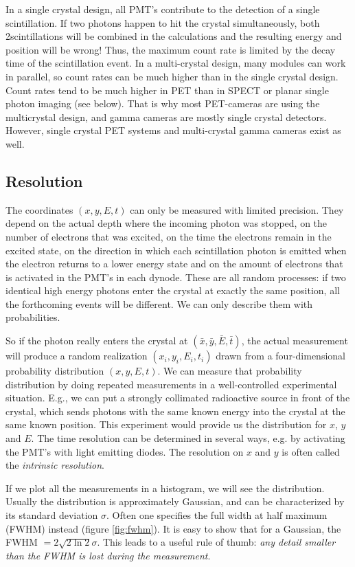 \documentclass[11pt,oneside]{book}
\begin{document}
In a single crystal design, all PMT's contribute to the detection of a single
scintillation. If two photons happen to hit the crystal simultaneously, both
2scintillations will be combined in the calculations and the resulting energy
and position will be wrong! Thus, the maximum count rate is limited by the
decay time of the scintillation event. In a multi-crystal design, many modules
can work in parallel, so count rates can be much higher than in the single
crystal design. Count rates tend to be much higher in PET than in SPECT or
planar single photon imaging (see below). That is why most PET-cameras are
using the multicrystal design, and gamma cameras are mostly single crystal
detectors. However, single crystal PET systems and multi-crystal gamma cameras
exist as well.


\subsection{Resolution} \label{sec:resolution}
The coordinates $(x, y, E, t)$ can only be measured with limited precision.
They depend on the actual depth where the incoming photon was stopped, on
the number of electrons that was excited, on the time the electrons remain
in the excited state, on the direction in which each scintillation photon is
emitted when the electron returns to a lower energy state and on the amount of
electrons that is activated in the PMT's in each dynode. These are all
random processes: if two identical high energy photons enter the crystal at
exactly the same position, all the forthcoming events will be different. We
can only describe them with probabilities.

So if the photon really enters the crystal at $(\bar{x}, \bar{y}, \bar{E},
\bar{t})$, the actual measurement will produce a random realization $(x_i,
y_i, E_i, t_i)$ drawn from a four-dimensional probability distribution
$(x, y, E, t)$. We can measure that probability distribution by doing
repeated measurements in a well-controlled experimental situation. E.g., we
can put a strongly collimated radioactive source in front of the crystal,
which sends photons with the same known energy into the crystal at the same
known position. This experiment would provide us the distribution for $x$,
$y$ and $E$. The time resolution can be determined in several ways, e.g. by
activating the PMT's with light emitting diodes. The resolution on $x$ and $y$
is often called the {\em intrinsic resolution}.

If we plot all the measurements in a histogram, we will see the
distribution. Usually the distribution is approximately Gaussian, and can be
characterized by its standard deviation $\sigma$. Often one specifies the
full width at half maximum (FWHM) instead (figure \ref{fig:fwhm}). It is easy
to show that for a Gaussian, the FWHM $ = 2 \sqrt{2 \ln 2} \sigma$. This
leads to a useful rule of thumb: {\em any detail smaller than the FWHM is lost
during the measurement}.
 
\end{document}
